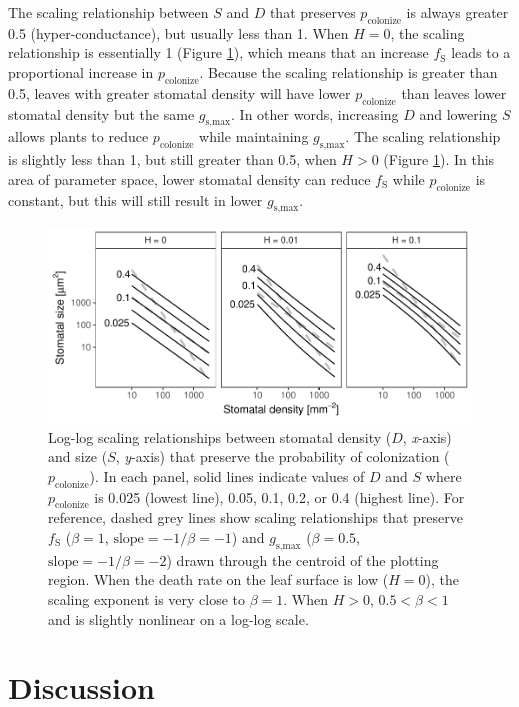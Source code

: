 \documentclass[utf8]{frontiersSCNS}
\newcommand{\fs}{$f_\text{S}$}
\newcommand{\gsmax}{$g_\text{s,max}$}
\begin{document}
The scaling relationship between \(S\) and \(D\) that preserves
\(p_\text{colonize}\) is always greater 0.5 (hyper-conductance), but
usually less than 1. When \(H = 0\), the scaling relationship is
essentially 1 (Figure \ref{fig:fig4}), which means that an increase
\fs{} leads to a proportional increase in \(p_\text{colonize}\). Because
the scaling relationship is greater than 0.5, leaves with greater
stomatal density will have lower \(p_\text{colonize}\) than leaves lower
stomatal density but the same \gsmax. In other words, increasing \(D\)
and lowering \(S\) allows plants to reduce \(p_\text{colonize}\) while
maintaining \gsmax. The scaling relationship is slightly less than 1,
but still greater than 0.5, when \(H > 0\) (Figure \ref{fig:fig4}). In
this area of parameter space, lower stomatal density can reduce \fs{}
while \(p_\text{colonize}\) is constant, but this will still result in
lower \gsmax.

\begin{figure}
  \centering
    \includegraphics{../figures/fig4.pdf}
    \caption{Log-log scaling relationships between stomatal density ($D$, \textit{x}-axis) and size ($S$, \textit{y}-axis) that preserve the probability of colonization ($p_\text{colonize}$). In each panel, solid lines indicate values of $D$ and $S$ where $p_\text{colonize}$ is 0.025 (lowest line), 0.05, 0.1, 0.2, or 0.4 (highest line). For reference, dashed grey lines show scaling relationships that preserve \fs{} ($\beta = 1$, $\text{slope} = - 1 / \beta = -1$) and \gsmax{} ($\beta = 0.5$, $\text{slope} = - 1 / \beta = -2$) drawn through the centroid of the plotting region. When the death rate on the leaf surface is low ($H = 0$), the scaling exponent is very close to $\beta = 1$. When $H > 0$, $0.5 < \beta < 1$ and is slightly nonlinear on a log-log scale.}
    \label{fig:fig4}
\end{figure}

\hypertarget{discussion}{%
\section*{Discussion}\label{discussion}}
\end{document}
